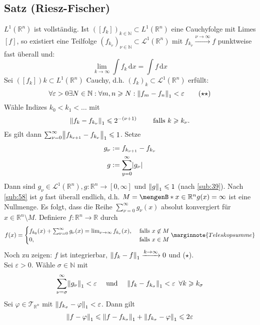 \subsection{Satz (Riesz-Fischer)} %
\label{sub:63}
$L^1(\mathds{R}^n)$ ist vollständig. Ist $([f_k])_{k \in \mathds{N}} \subset L^1(\mathds{R}^n)$ eine Cauchyfolge mit Limes $[f]$, so existiert eine Teilfolge 
$(f_{k_\nu})_{\nu \in \mathds{N}} \subset \mathcal{L}^1(\mathds{R}^n)$ mit $f_{k_\nu} \xrightarrow{\nu \to \infty} f$ punktweise fast überall und:
\[
	\lim_{ k \to \infty} \int\! f_k  \, \mathrm{d}x = \int\! f  \, \mathrm{d}x \tag{$\star$}
\] 
Sei $([f_k])k \subset L^1(\mathds{R}^n)$ Cauchy, d.h. $(f_k)_k \subset \mathcal{L}^1(\mathds{R}^n)$ erfüllt:
\[
	\forall \varepsilon >0 \exists N \in \mathds{N} : \forall m,n \ge N : \norm[1]{f_m -f_n} < \varepsilon \tag{$\star\star$} 
\]
Wähle Indizes $k_0 < k_1 < \ldots $ mit
\[
	\norm[1]{f_k - f_{k_\nu}} \le 2^{-(\nu+1)} \qquad \text{ falls } k \ge k_\nu.
\]
Es gilt dann $\sum_{\nu=0}^{\infty} \norm[1]{f_{k_{\nu+1}} - f_{k_\nu}} \le 1 $. Setze 
\begin{align*}
	g_\nu &:= f_{k_{\nu+1}} - f_{k_\nu}\\
	g &:= \sum_{y=0}^{\infty} \abs*{g_\nu}
\end{align*}
Dann sind $g_\nu \in \mathcal{L}^1(\mathds{R}^n), g: \mathds{R}^n \to [0,\infty]$ und $\norm[1]{g} \le 1 $ (nach \ref{sub:39}). Nach \ref{sub:58} ist $g$ fast überall 
endlich, d.h. $M= \set[x \in \mathds{R}^n]{g(x)=\infty} $ ist eine Nullmenge. Es folgt, dass die Reihe $\sum_{\nu=0}^{\infty} g_\nu (x) $ absolut konvergiert für
$x \in \mathds{R}^n \setminus M$. Definiere $f : \mathds{R}^n \to \mathds{R}$ durch
\[
	f(x) = \begin{cases}
		f_{k_0}(x) + \sum_{\nu=0}^{\infty} g_\nu (x) = \lim_{ \nu \to \infty} f_{k_\nu}(x), &\text{ falls }x \not\in M\\
		0 , &\text{ falls } x \in M
	\end{cases} \marginnote{Teleskopsumme}
\]
Noch zu zeigen: $f$ ist integrierbar, $\norm[1]{f_k -f} \xrightarrow{k \to \infty} 0 $ und ($\star$). \\
Sei $\varepsilon>0$. Wähle $\sigma \in \mathds{N}$ mit
\[
	\sum_{\nu=\sigma}^{\infty} \norm[1]{g_\nu} < \varepsilon \quad \text{ und } \quad \norm[1]{f_k - f_{k_\sigma}}< \varepsilon \enspace\forall k \ge k_\sigma 
\]
Sei $\varphi \in \mathcal{T}_{\mathds{R}^n}$ mit $\norm[1]{f_{k_\sigma} - \varphi} < \varepsilon $. Dann gilt
\begin{align*}
	\norm[1]{f- \varphi} \le \norm[1]{f- f_{k_\sigma}} + \norm[1]{f_{k_\sigma} - \varphi} \le 2 \varepsilon   
\end{align*}

